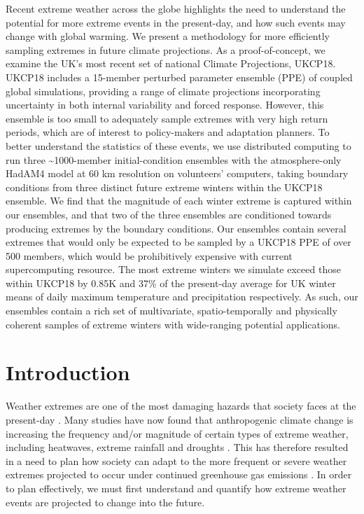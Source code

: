   Recent extreme weather across the globe highlights the need to understand the potential for more extreme events in the present-day, and how such events may change with global warming. We present a methodology for more efficiently sampling extremes in future climate projections. As a proof-of-concept, we examine the UK's most recent set of national Climate Projections, UKCP18. UKCP18 includes a 15-member perturbed parameter ensemble (PPE) of coupled global simulations, providing a range of climate projections incorporating uncertainty in both internal variability and forced response. However, this ensemble is too small to adequately sample extremes with very high return periods, which are of interest to policy-makers and adaptation planners. To better understand the statistics of these events, we use distributed computing to run three \textasciitilde1000-member initial-condition ensembles with the atmosphere-only HadAM4 model at 60 km resolution on volunteers' computers, taking boundary conditions from three distinct future extreme winters within the UKCP18 ensemble. We find that the magnitude of each winter extreme is captured within our ensembles, and that two of the three ensembles are conditioned towards producing extremes by the boundary conditions. Our ensembles contain several extremes that would only be expected to be sampled by a UKCP18 PPE of over 500 members, which would be prohibitively expensive with current supercomputing resource. The most extreme winters we simulate exceed those within UKCP18 by 0.85K and 37\% of the present-day average for UK winter means of daily maximum temperature and precipitation respectively. As such, our ensembles contain a rich set of multivariate, spatio-temporally and physically coherent samples of extreme winters with wide-ranging potential applications.

\section{Introduction}\label{ch5:intro}

  Weather extremes are one of the most damaging hazards that society faces at the present-day \citep{wef_global_2021}. Many studies have now found that anthropogenic climate change is increasing the frequency and/or magnitude of certain types of extreme weather, including heatwaves, extreme rainfall and droughts \citep{masson-delmotte_weather_2021}. This has therefore resulted in a need to plan how society can adapt to the more frequent or severe weather extremes projected to occur under continued greenhouse gas emissions \citep{allen_warming_2009,diffenbaugh_quantifying_2017,rahmstorf_increase_2011}. In order to plan effectively, we must first understand and quantify how extreme weather events are projected to change into the future.

